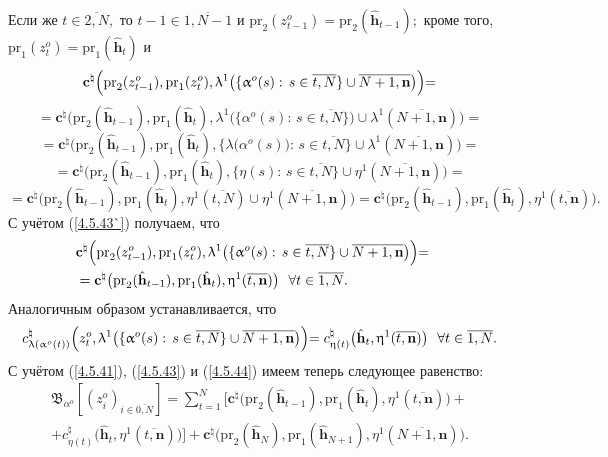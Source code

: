 \documentclass[12pt,twoside]{report}
\newcommand{\ov}{\overline}
\newcommand{\la}{\lambda}
\newcommand{\al}{\alpha}
\newcommand{\fa}{\forall}
\begin{document}
{{ Если же $t\in \ov{2,N},$ то $t-1\in \ov{1,N-1}$ и $\mathrm{pr}_2(z_{t-1}^o) =
\mathrm{pr}_2(\hat{\mathbf{h}}_{t-1});$ кроме того, $\mathrm{pr}_1(z_t^o) =
\mathrm{pr}_1(\hat{\mathbf{h}}_t)$ и
$$\mathbf{c}^\natural\Bigl(\mathrm{pr}_2(z_{t-1}^o),\mathrm{pr}_1(z_t^o),
\la^1\bigl(\{\al^o(s):\,s\in \ov{t,N}\}\cup \ov{N+1,\mathbf{n}}\bigl)\Bigl) =
$$
$$
= \mathbf{c}^\natural\bigl(\mathrm{pr}_2(\hat{\mathbf{h}}_{t-1}),
\mathrm{pr}_1(\hat{\mathbf{h}}_t),
\la^1\bigl(\{\al^o(s):\,s\in\ov{t,N}\}\bigl)\cup \la^1(\ov{N+1,\mathbf{n}})\bigl)=
$$
$$
= \mathbf{c}^\natural\bigl(\mathrm{pr}_2(\hat{\mathbf{h}}_{t-1}),
\mathrm{pr}_1(\hat{\mathbf{h}}_t),
\{\la\bigl(\al^o(s)\bigl):\,s\in\ov{t,N}\}\cup\la^1(\ov{N+1,\mathbf{n}})\bigl)=
$$
$$
=\mathbf{c}^\natural\bigl(\mathrm{pr}_2(\hat{\mathbf{h}}_{t-1}),
\mathrm{pr}_1(\hat{\mathbf{h}}_t),
\{\eta(s):\,s\in\ov{t,N}\}\cup \eta^1(\ov{N+1,\mathbf{n}})\bigl)=
$$
$$= \mathbf{c}^\natural\bigl(\mathrm{pr}_2(\hat{\mathbf{h}}_{t-1}),
\mathrm{pr}_1(\hat{\mathbf{h}}_t),
\eta^1(\ov{t,N})\cup \eta^1(\ov{N+1,\mathbf{n}})\bigl)=
\mathbf{c}^\natural\bigl(\mathrm{pr}_2(\hat{\mathbf{h}}_{t-1}),
\mathrm{pr}_1(\hat{\mathbf{h}}_t),
\eta^1(\ov{t,\mathbf{n}})\bigl).
$$
С учётом (\ref{4.5.43`}) получаем, что
\begin{eqnarray}
&\mathbf{c}^\natural\Bigl(\mathrm{pr}_2(z_{t-1}^o),\mathrm{pr}_1(z_t^o),
\la^1\bigl(\{\al^o(s):\,s\in \ov{t,N}\}
\cup \ov{N+1,\mathbf{n}}\bigl)\Bigl)=
&\nonumber\\
&= \mathbf{c}^\natural\bigl(\mathrm{pr}_2(\hat{\mathbf{h}}_{t-1}),
\mathrm{pr}_1(\hat{\mathbf{h}}_t),
\eta^1(\ov{t,\mathbf{n}})\bigl)\ \ \fa t\in \ov{1,N}.
&\label{4.5.44}
\end{eqnarray}
Аналогичным образом устанавливается, что
$$c_{\la(\al^o(t))}^\natural\Bigl(z_t^o,\la^1\bigl(\{\al^o(s):\,s\in
\ov{t,N}\} \cup \ov{N+1,\mathbf{n}}\bigl)\Bigl) =
c_{\eta(t)}^\natural\bigl(\hat{\mathbf{h}}_t,\eta^1(\ov{t,\mathbf{n}})\bigl) \ \
\fa t\in\ov{1,N}.
$$
С учётом (\ref{4.5.41}), (\ref{4.5.43}) и (\ref{4.5.44}) имеем теперь следующее равенство:
\begin{eqnarray}
&\mathfrak{B}_{\al^o}[(z_i^o)_{i\in\ov{0,N}}] =
\sum\limits_{t=1}^N\bigl[\mathbf{c}^\natural\bigl(\mathrm{pr}_2(\hat{\mathbf{h}}_{t-1}),
\mathrm{pr}_1(\hat{\mathbf{h}}_t),\eta^1(\ov{t,\mathbf{n}})\bigl) +
&\nonumber\\
&+c_{\eta(t)}^\natural\bigl(\hat{\mathbf{h}}_t,\eta^1(\ov{t,\mathbf{n}})\bigl)
\bigl] + \mathbf{c}^\natural\bigl(\mathrm{pr}_2(\hat{\mathbf{h}}_N),
\mathrm{pr}_1(\hat{\mathbf{h}}_{N+1}),
\eta^1(\ov{N+1,\mathbf{n}})\bigl).

\end{eqnarray}}}
\end{document}
